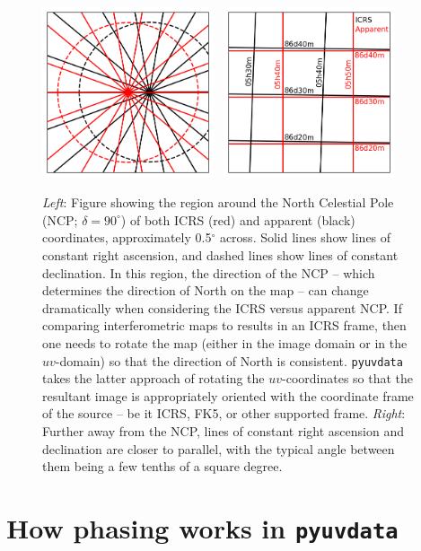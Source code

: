 \documentclass[11pt, oneside]{article}
\begin{document}
\begin{figure}[!t]
    \centering
    \includegraphics[width=0.45\textwidth]{ncp_icrs_app.png}
    \ 
    \includegraphics[width=0.45\textwidth]{app_icrs_frame_comp.png}
    \caption{\emph{Left}: Figure showing the region around the North Celestial Pole (NCP; $\delta=90^{\circ}$) of both ICRS (red) and apparent (black) coordinates, approximately 0.5$^{\circ}$ across. Solid lines show lines of constant right ascension, and dashed lines show lines of constant declination. In this region, the direction of the NCP -- which determines the direction of North on the map -- can change dramatically when considering the ICRS versus apparent NCP. If comparing interferometric maps to results in an ICRS frame, then one needs to rotate the map (either in the image domain or in the $uv$-domain) so that the direction of North is consistent. \texttt{pyuvdata} takes the latter approach of rotating the $uv$-coordinates so that the resultant image is appropriately oriented with the coordinate frame of the source -- be it ICRS, FK5, or other supported frame. \emph{Right}: Further away from the NCP, lines of constant right ascension and declination are closer to parallel, with the typical angle between them being a few tenths of a square degree.}
    \label{fig:coord_figures}
\end{figure}

\section{How phasing works in \texttt{pyuvdata}}\label{sec:methods}
\end{document}

